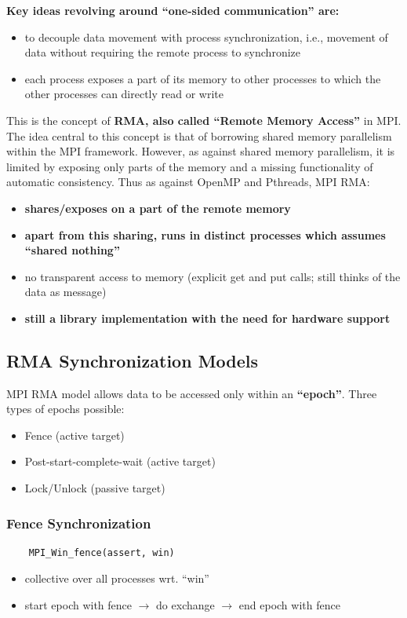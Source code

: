 \documentclass[12pt, a4paper]{report}
\begin{document}
{\bfseries{Key ideas revolving around ``one-sided communication'' are:}}
\begin{itemize}
    \item to decouple data movement with process synchronization, i.e., movement of data without requiring the remote process to synchronize
    \item each process exposes a part of its memory to other processes to which the other processes can directly read or write
\end{itemize}
This is the concept of {\bfseries{RMA, also called ``Remote Memory Access''}} in MPI. The idea central to this concept is that of borrowing shared memory 
parallelism within the MPI framework. However, as against shared memory parallelism, it is limited by exposing only parts of the memory and a missing
functionality of automatic consistency. Thus as against OpenMP and Pthreads, MPI RMA:
\begin{itemize}
    \item {\bfseries{shares/exposes on a part of the remote memory}}
    \item {\bfseries{apart from this sharing, runs in distinct processes which assumes ``shared nothing''}}
    \item no transparent access to memory (explicit get and put calls; still thinks of the data as message)
    \item {\bfseries{still a library implementation with the need for hardware support}}
\end{itemize}

\subsection{RMA Synchronization Models}
MPI RMA model allows data to be accessed only within an {\bfseries{``epoch''}}. Three types of epochs possible:
\begin{itemize}
    \item Fence (active target)
    \item Post-start-complete-wait (active target)
    \item Lock/Unlock (passive target)
\end{itemize}

\subsubsection{Fence Synchronization}
\begin{verbatim}
    MPI_Win_fence(assert, win)
\end{verbatim}
\begin{itemize}
    \item collective over all processes wrt. ``win''
    \item start epoch with fence $\rightarrow$ do exchange $\rightarrow$ end epoch with fence
\end{itemize}
\end{document}
